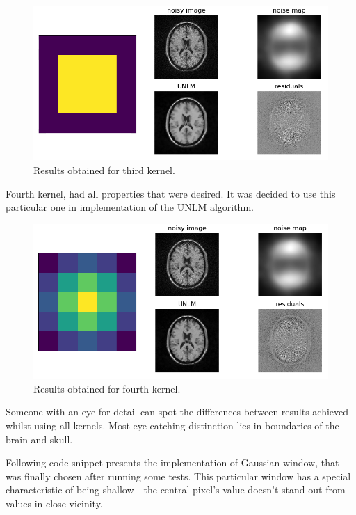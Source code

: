 \begin{figure}[H]
	\centering{}
	\includegraphics[scale=0.7]{figures/module05/gk3results}
	\caption{Results obtained for third kernel.} 
\end{figure}

Fourth kernel, had all properties that were desired. It was decided to use this particular one in implementation of the UNLM algorithm.

\begin{figure}[H]
	\centering{}
	\includegraphics[scale=0.7]{figures/module05/gk4results}
	\caption{Results obtained for fourth kernel.} 
\end{figure}

Someone with an eye for detail can spot the differences between results achieved whilst using all kernels. Most eye-catching distinction lies in boundaries of the brain and skull.   


Following code snippet presents the implementation of Gaussian window, that was finally chosen after running some tests. This particular window has a special characteristic of being shallow - the central pixel's value doesn't stand out from values in close vicinity. 

